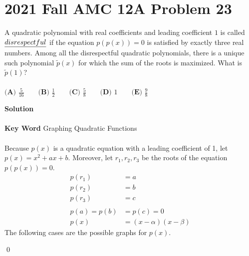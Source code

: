 \documentclass{article}
\newenvironment{solution}{\begin{trivlist}\item[]{\bf Solution}}{\qed \end{trivlist}}
\begin{document}
\newpage
\section*{2021 Fall AMC 12A Problem 23}
A quadratic polynomial with real coefficients and leading coefficient $1$ is called $\emph{disrespectful}$ if the equation $p(p(x))=0$ is satisfied by exactly three real numbers. Among all the disrespectful quadratic polynomials, there is a unique such polynomial $\tilde{p}(x)$ for which the sum of the roots is maximized. What is $\tilde{p}(1)$?
\\\\
$\textbf{(A) } \frac{5}{16} \qquad\textbf{(B) } \frac{1}{2} \qquad\textbf{(C) } \frac{5}{8} \qquad\textbf{(D) } 1 \qquad\textbf{(E) } \frac{9}{8}$

\begin{solution}
\\\\
\textbf{Key Word} Graphing Quadratic Functions
\\\\
Because $p(x)$ is a quadratic equation with a leading coefficient of 1, let $p(x) = x^2 + ax + b$. Moreover, let $r_1, r_2, r_3$ be the roots of the equation $p(p(x)) = 0$.
\begin{align*}
    p(r_1) &= a \\
    p(r_2) &= b \\
    p(r_3) &= c
    \\\\
    p(a) = p(b) &= p(c) = 0 \\
    p(x) &= (x - \alpha)(x - \beta)
\end{align*}
The following cases are the possible graphs for $p(x)$.
\begin{center}
\end{center}
\end{solution}
\end{document}
